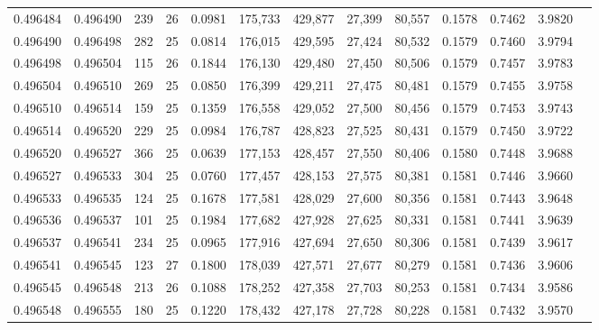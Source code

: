 \begin{tabular}{rrrrrrrrrrrrr}
0.496484 & 0.496490 & 239 &  26 &                                     0.0981 & 175,733 & 429,877 &  27,399 &  80,557 & 0.1578 & 0.7462 & 3.9820 \\
0.496490 & 0.496498 & 282 &  25 &                                     0.0814 & 176,015 & 429,595 &  27,424 &  80,532 & 0.1579 & 0.7460 & 3.9794 \\
0.496498 & 0.496504 & 115 &  26 &                                     0.1844 & 176,130 & 429,480 &  27,450 &  80,506 & 0.1579 & 0.7457 & 3.9783 \\
0.496504 & 0.496510 & 269 &  25 &                                     0.0850 & 176,399 & 429,211 &  27,475 &  80,481 & 0.1579 & 0.7455 & 3.9758 \\
0.496510 & 0.496514 & 159 &  25 &                                     0.1359 & 176,558 & 429,052 &  27,500 &  80,456 & 0.1579 & 0.7453 & 3.9743 \\
0.496514 & 0.496520 & 229 &  25 &                                     0.0984 & 176,787 & 428,823 &  27,525 &  80,431 & 0.1579 & 0.7450 & 3.9722 \\
0.496520 & 0.496527 & 366 &  25 &                                     0.0639 & 177,153 & 428,457 &  27,550 &  80,406 & 0.1580 & 0.7448 & 3.9688 \\
0.496527 & 0.496533 & 304 &  25 &                                     0.0760 & 177,457 & 428,153 &  27,575 &  80,381 & 0.1581 & 0.7446 & 3.9660 \\
0.496533 & 0.496535 & 124 &  25 &                                     0.1678 & 177,581 & 428,029 &  27,600 &  80,356 & 0.1581 & 0.7443 & 3.9648 \\
0.496536 & 0.496537 & 101 &  25 &                                     0.1984 & 177,682 & 427,928 &  27,625 &  80,331 & 0.1581 & 0.7441 & 3.9639 \\
0.496537 & 0.496541 & 234 &  25 &                                     0.0965 & 177,916 & 427,694 &  27,650 &  80,306 & 0.1581 & 0.7439 & 3.9617 \\
0.496541 & 0.496545 & 123 &  27 &                                     0.1800 & 178,039 & 427,571 &  27,677 &  80,279 & 0.1581 & 0.7436 & 3.9606 \\
0.496545 & 0.496548 & 213 &  26 &                                     0.1088 & 178,252 & 427,358 &  27,703 &  80,253 & 0.1581 & 0.7434 & 3.9586 \\
0.496548 & 0.496555 & 180 &  25 &                                     0.1220 & 178,432 & 427,178 &  27,728 &  80,228 & 0.1581 & 0.7432 & 3.9570 \\

\end{tabular}
